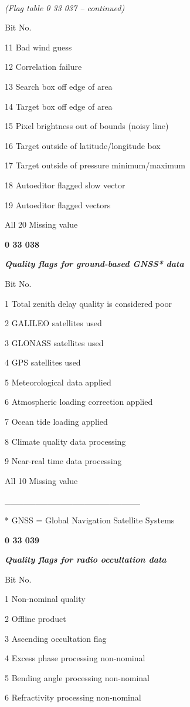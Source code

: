 \emph{\\
(Flag table 0 33 037 -- continued)}

Bit No.

11 Bad wind guess

12 Correlation failure

13 Search box off edge of area

14 Target box off edge of area

15 Pixel brightness out of bounds (noisy line)

16 Target outside of latitude/longitude box

17 Target outside of pressure minimum/maximum

18 Autoeditor flagged slow vector

19 Autoeditor flagged vectors

All 20 Missing value

\textbf{0 33 038}

\emph{\textbf{Quality flags for ground-based GNSS* data}}

Bit No.

1 Total zenith delay quality is considered poor

2 GALILEO satellites used

3 GLONASS satellites used

4 GPS satellites used

5 Meteorological data applied

6 Atmospheric loading correction applied

7 Ocean tide loading applied

8 Climate quality data processing

9 Near-real time data processing

All 10 Missing value

\_\_\_\_\_\_\_\_\_\_\_\_\_\_\_\_\_\_\_\_\_\_

* GNSS = Global Navigation Satellite Systems

\textbf{0 33 039}

\emph{\textbf{Quality flags for radio occultation data}}

Bit No.

1 Non-nominal quality

2 Offline product

3 Ascending occultation flag

4 Excess phase processing non-nominal

5 Bending angle processing non-nominal

6 Refractivity processing non-nominal

